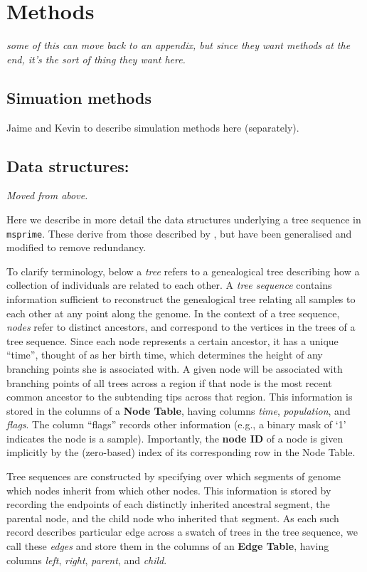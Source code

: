 \documentclass{article}
\newcommand{\msprime}{\texttt{msprime}}
\newcommand{\plr}[1]{{\em \color{blue} #1}}
\newcommand{\jk}[1]{{\em \color{red} #1}}
\begin{document}
\section*{Methods}

\plr{some of this can move back to an appendix, but since they want methods at the end,
it's the sort of thing they want here.}

\subsection*{Simuation methods}

Jaime and Kevin to describe simulation methods here (separately).

\subsection*{Data structures:}
\jk{Moved from above.}

Here we describe in more detail the data structures underlying a tree sequence in \msprime.
These derive from those described by \citet{kelleher2016efficient},
but have been generalised and modified to remove redundancy.

To clarify terminology,
below a \emph{tree} refers to
a genealogical tree describing how a collection of individuals are related to each other.
A \emph{tree sequence} contains information sufficient to reconstruct the genealogical
tree relating all samples to each other at any point along the genome.
In the context of a tree sequence, \emph{nodes} refer to distinct ancestors,
and correspond to the vertices in the trees of a tree sequence.
Since each node represents a certain ancestor, it has a unique ``time'', thought of as her birth time,
which determines the height of any branching points she is associated with.  A given node will be
associated with branching points of all trees across a region if that node
is the most recent common ancestor to the subtending tips across that region.
This information is stored in the columns of a \textbf{Node Table},
having columns \emph{time}, \emph{population}, and \emph{flags}.
The column ``flags'' records other information
(e.g., a binary mask of `1' indicates the node is a sample).
Importantly, the \textbf{node ID} of a node is given implicitly
by the (zero-based) index of its corresponding row in the Node Table.

Tree sequences are constructed by specifying over which segments of genome
which nodes inherit from which other nodes.  This information is stored by
recording the endpoints of each distinctly inherited ancestral segment,
the parental node, and the child node who inherited that segment.
As each such record describes particular edge across a swatch of trees in the tree sequence,
we call these \emph{edges}
and store them in the columns of an \textbf{Edge Table},
having columns \emph{left}, \emph{right}, \emph{parent}, and \emph{child}.
\end{document}

